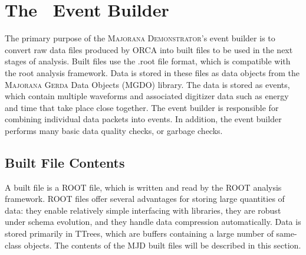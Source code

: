 \documentclass[/main.tex]{subfiles}
\begin{document}
\onlyinsubfile{\appendix}
\chapter{The \MJD\ Event Builder}
\label{app:eventbuilder}

The primary purpose of the \textsc{Majorana Demonstrator}'s event builder is to convert raw data files produced by ORCA into built files to be used in the next stages of analysis.
Built files use the .root file format, which is compatible with the root analysis framework.
Data is stored in these files as data objects from the \textsc{Majorana Gerda} Data Objects (MGDO) library.
The data is stored as events, which contain multiple waveforms and associated digitizer data such as energy and time that take place close together.
The event builder is responsible for combining individual data packets into events.
In addition, the event builder performs many basic data quality checks, or garbage checks.

\section{Built File Contents} \label{sec:file_contents}

A built file is a ROOT file, which is written and read by the ROOT analysis framework.
ROOT files offer several advantages for storing large quantities of data: they enable relatively simple interfacing with \cpp libraries, they are robust under schema evolution, and they handle data compression automatically.
Data is stored primarily in TTrees, which are buffers containing a large number of same-class \cpp objects.
The contents of the MJD built files will be described in this section.
\end{document}
